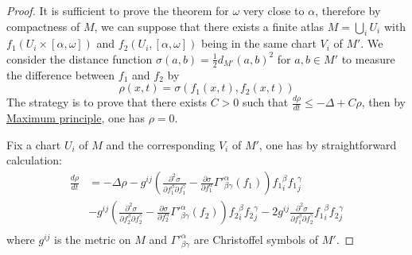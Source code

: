 \begin{proof}
It is sufficient to prove the theorem for \(\omega\) very close to \(\alpha\),
therefore by compactness of \(M\), we can suppose that there exists a finite atlas \(M
= \bigcup_i U_i\) with \(f_1 (U_i\times [\alpha,\omega])\) and \(f_2
(U_i,[\alpha,\omega])\) being in the same chart \(V_i\) of \(M'\). We consider the
distance function \(\sigma(a,b) = \frac{1}{2}d_{M'}(a,b)^2\) for \(a,b\in M'\) to
measure the difference between \(f_1\) and \(f_2\) by 
\[
 \rho(x,t) = \sigma(f_1(x,t), f_2(x,t))
\]
The strategy is to prove that there exists \(C>0\) such that \(\frac{d \rho}{d t} \leq
-\Delta + C\rho\), then by \href{elliptic-parabolic.org}{Maximum principle}, one has \(\rho = 0\).

Fix a chart \(U_i\) of \(M\) and the corresponding \(V_i\) of \(M'\), one has by
straightforward calculation:
\begin{align*}
 \frac{d\rho}{d t} &= -\Delta \rho -g^{ij}\left( \frac{\partial^2 \sigma}{\partial
 f_1^\beta \partial f_1^\gamma} - \frac{\partial \sigma}{\partial f_1^\alpha} {\Gamma'}
^{\alpha}_{\beta\gamma}(f_1) \right) {f_1}^\beta_i {f_1}^\gamma_j\\
	        &- g^{ij}\left( \frac{\partial^2 \sigma}{\partial
 f_2^\beta \partial f_2^\gamma} - \frac{\partial \sigma}{\partial f_2^\alpha} {\Gamma'}
^{\alpha}_{\beta\gamma}(f_2) \right) {f_2}^\beta_i {f_2}^\gamma_j - 2g^{ij}\frac{\partial^2 \sigma}{\partial f_1^\beta \partial f_2^\gamma} {f_1}^\beta_i {f_2}^\gamma_j  \\
\end{align*}
where \(g^{ij}\) is the metric on \(M\) and \({\Gamma'}^\alpha_{\beta\gamma}\) are
Christoffel symbols of \(M'\). 



\end{proof}
